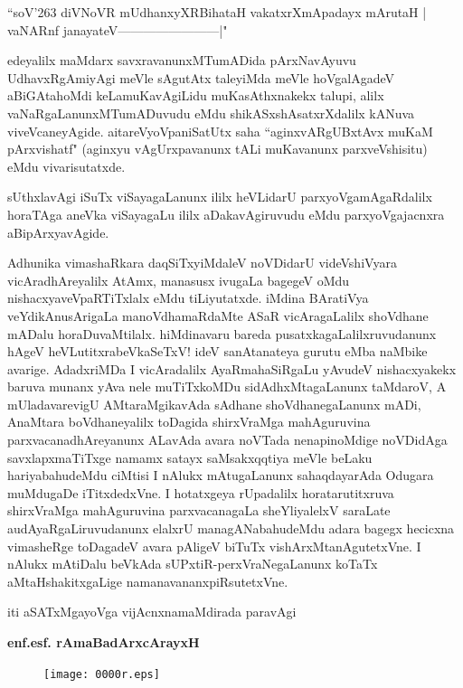 \begin{shloka}
``soV\char'263 diVNoVR mUdhanxyXRBihataH vakatxrXmApadayx mArutaH |\\
vaNARnf janayateV------------------------|"
\end{shloka}

edeyalilx maMdarx savxravanunxMTumADida pArxNavAyuvu UdhavxRgAmiyAgi meVle sAgutAtx tale\-yiMda meVle hoVgalAgadeV aBiGAtahoMdi keLamuKa\-vAgiLidu muKasAthxnakekx talupi, alilx vaNaR\-gaLa\-nunxMTu\-mADuvudu eMdu shikASx\-shAsatxrXdalilx kANuva viveVcaneyAgide. aitareVyoVpaniSatUtx saha ``aginxvARgUBxtAvx muKaM pArxvishatf" (aginxyu vAgUrxpavanunx tALi muKavanunx parxveVshisitu) eMdu vivarisutatxde.

sUthxlavAgi iSuTx viSayagaLanunx ililx heVLidarU parxyoVgamAgaRdalilx horaTAga aneVka viSaya\-gaLu ililx aDakavAgiruvudu eMdu parxyoVgajacnxra aBipArxyavAgide.

Adhunika vimashaRkara daqSiTxyiMdaleV noVDidarU videVshiVyara vicAra\-dhAreyalilx AtAmx, manasusx\- ivu\-gaLa bagegeV oMdu nishacxyaveVpaRTiTxlalx eMdu tiLiyutatxde. iMdina BAratiVya veYdikAnu\-sAri\-gaLa manoVdhamaRdaMte ASaR vicAragaLalilx shoVdhane mADalu horaDuvaMtilalx. hiMdinavaru bareda pusatxkagaLalilxruvudanunx hAgeV heVLutitxrabeVkaSeTxV! ideV sanAtanateya gurutu eMba naMbike avarige. AdadxriMDa I vicAradalilx AyaRmahaSiRgaLu yAvudeV nishacxyakekx baruva munanx yAva nele muTiTx\-koMDu sidAdhxMtagaLanunx taMdaroV, A mUladavarevigU AMtaraMgikavAda sAdhane shoVdhanegaLanunx mADi, AnaMtara boVdhaneyalilx toDagida shirxVraMga mahAguruvina parxvacanadhAreyanunx ALavAda avara noVTada nenapinoMdige noVDidAga savxlapxmaTiTxge namamx satayx saMsakxqqtiya meVle beLaku hariyabahudeMdu ciMtisi I nAlukx mAtugaLanunx sahaqdayarAda Odugara muMdugaDe iTitxdedxVne. I hotatx\-geya rUpa\-dalilx horatarutitxruva shirxVraMga mahAguruvina parxvacanagaLa sheYliyalelxV saraLate audAyaR\-gaLiruvu\-danunx elalxrU managANabahudeMdu adara bagegx hecicxna vimasheRge toDagadeV avara pAligeV biTuTx vishArxMta\-nAgutetxVne. I nAlukx mAtiDalu beVkAda sUPxtiR-perxVraNegaLanunx koTaTx aMtaHshakitxgaLige namana\-vananxpiRsu\-tetxVne.

\bigskip

\hfill iti aSATxMgayoVga vijAcnxnamaMdirada paravAgi

\smallskip

\hfill {\bf enf.esf. rAmaBadArxcArayxH}

\newpage

\begin{figure}[h]
\centering
{\texttt{[image: 0000r.eps]}}
\end{figure}
